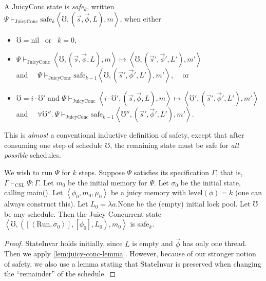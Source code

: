\begin{definition}[Safety]
\label{def:safety}
  A JuicyConc state is \emph{safe}$_k$,  written \\
  $\Psi \vdash_\mathrm{JuicyConc} \mathrm{safe}_k\left<\mho, (\vec{s},\vec{\phi}, L), m\right>$,
  when either
  \begin{itemize}[itemindent=-1em]
  \item $\mho=\mathrm{nil}$ ~or~ $k=0$,
  \item $\Psi \vdash_\mathrm{JuicyConc} \left<\mho, (\vec{s},\vec{\phi}, L), m\right>\mapsto 
    \left<\mho, (\vec{s}',\vec{\phi}', L'), m'\right>$
 \\   and ~~$\Psi \vdash_\mathrm{JuicyConc} \mathrm{safe}_{k-1}\left<\mho, (\vec{s}',\vec{\phi}', L'), m'\right>$, ~~or
  \item $\mho\!= \!i \cdot \mho'$ and 
  $\Psi \vdash_\mathrm{JuicyConc} \left<i \cdot \mho', (\vec{s},\vec{\phi}, L), m\right>\mapsto 
    \left<\mho', (\vec{s}',\vec{\phi}', L'), m'\right>$ \\
    and  ~~$\forall \mho''.~\Psi \vdash_\mathrm{JuicyConc} \mathrm{safe}_{k-1}\left<\mho'', (\vec{s}',\vec{\phi}', L'), m'\right>$.
  \end{itemize}
\end{definition}
This is \emph{almost} a conventional inductive definition of safety,
except that after consuming one step of schedule $\mho$,
the remaining state must be safe for \emph{all possible} schedules.

\begin{theorem}
\label{thm:juicyseq:juicyconc}
We wish to run $\Psi$ for $k$ steps.
Suppose $\Psi$ satisfies its specification $\Gamma$, that is,
$\Gamma \vdash_\mathrm{CSL} \Psi:\Gamma$.
Let $m_0$ be the initial memory for $\Psi$.
Let $\sigma_0$ be the initial state, calling 
\textsf{main()}.
Let $\left<\phi_0,m_0,\mu_0\right>$ be a juicy memory
with $\mathrm{level}(\phi)=k$
(one can always construct this).
Let $L_0 = \lambda a.\mathrm{None}$ be the (empty) initial lock pool.
Let $\mho$ be any schedule.
Then the Juicy Concurrent state
$\left<\mho, ([\left<\mathrm{Run},\sigma_0\right>],[\phi_0], L_0), m_0\right>$
is safe$_k$.
\end{theorem}
\begin{proof}
  StateInvar holds initially, since $L$ is empty and $\vec{\phi}$ has
  only one thread.
  Then we apply \autoref{lem:juicy-conc-lemma}.  However, because of our
  stronger notion of safety, we also use a lemma stating
  that StateInvar is preserved when changing the ``remainder'' of the
  schedule.
\end{proof}

